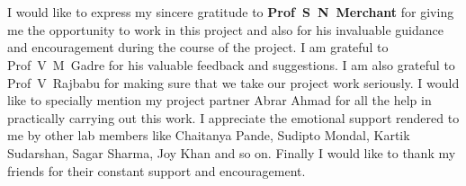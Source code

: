 \chapter*{}
I would like to express my sincere gratitude to \textbf{Prof~S~N~Merchant}
for giving me the opportunity to work in this project and also for his
invaluable guidance and encouragement during the course of the project. I am
grateful to Prof~V~M~Gadre for his valuable feedback and suggestions. I am
also grateful to Prof~V~Rajbabu for making sure that we take our project work
seriously. I would like to specially mention my project partner Abrar Ahmad 
for all the help in practically carrying out this work. I appreciate the 
emotional support rendered to me by other lab members like Chaitanya Pande, 
Sudipto Mondal, Kartik Sudarshan, Sagar Sharma, Joy Khan and so on. Finally
I would like to thank my friends for their constant support and encouragement.